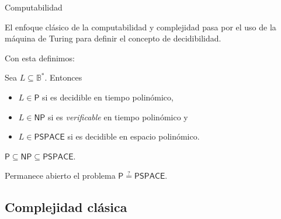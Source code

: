 \documentclass[ignorenonframetext,aspectratio=43,]{beamer}
\providecommand{\tightlist}{%
  \setlength{\itemsep}{0pt}\setlength{\parskip}{0pt}}
\newcommand{\BB}{\mathbb{B}}
\newcommand{\qeq}{\overset{?}{=}}
\begin{document}
\begin{frame}{Computabilidad}

  El enfoque clásico de la computabilidad y complejidad pasa por el uso
  de la máquina de Turing para definir el concepto de decidibilidad.

  Con esta definimos:

  \begin{definition}
    Sea $L \subseteq \BB^\ast$. Entonces

    \begin{itemize}
      \tightlist
    \item $L \in \mathsf{P}$ si es decidible en tiempo polinómico,
    \item $L \in \mathsf{NP}$ si es \emph{verificable} en tiempo polinómico y
    \item $L \in \mathsf{PSPACE}$ si es decidible en espacio polinómico.
    \end{itemize}
  \end{definition}


  $\mathsf{P} \subseteq \mathsf{NP} \subseteq \mathsf{PSPACE}.$


  Permanece abierto el problema $\mathsf{P} \qeq \mathsf{PSPACE}.$

\end{frame}

\subsection{Complejidad clásica}
\end{document}

